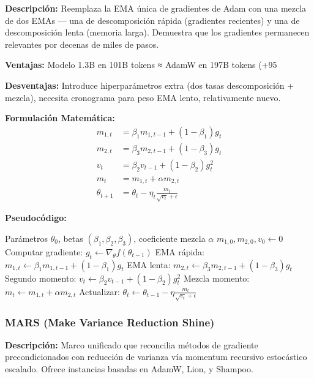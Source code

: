 \documentclass[11pt,a4paper]{article}
\begin{document}
\textbf{Descripción:} Reemplaza la EMA única de gradientes de Adam con una mezcla de dos EMAs — una de descomposición rápida (gradientes recientes) y una de descomposición lenta (memoria larga). Demuestra que los gradientes permanecen relevantes por decenas de miles de pasos.

\textbf{Ventajas:} Modelo 1.3B en 101B tokens ≈ AdamW en 197B tokens (+95%

\textbf{Desventajas:} Introduce hiperparámetros extra (dos tasas descomposición + mezcla), necesita cronograma para peso EMA lento, relativamente nuevo.

\textbf{Formulación Matemática:}
\begin{align}
m_{1,t} &= \beta_1 m_{1,t-1} + (1 - \beta_1) g_t \\
m_{2,t} &= \beta_3 m_{2,t-1} + (1 - \beta_3) g_t \\
v_t &= \beta_2 v_{t-1} + (1 - \beta_2) g_t^2 \\
m_t &= m_{1,t} + \alpha m_{2,t} \\
\theta_{t+1} &= \theta_t - \eta_t \frac{m_t}{\sqrt{v_t} + \epsilon}
\end{align}

\textbf{Pseudocódigo:}
\begin{algorithm}
\caption{AdEMAMix --- Mezcla de Medias Móviles Exponenciales}
\begin{algorithmic}[1]
\Require Parámetros $\theta_0$, betas $(\beta_1, \beta_2, \beta_3)$, coeficiente mezcla $\alpha$
\State $m_{1,0}, m_{2,0}, v_0 \gets 0$
\State Computar gradiente: $g_t \gets \nabla_\theta f(\theta_{t-1})$
\State EMA rápida: $m_{1,t} \gets \beta_1 m_{1,t-1} + (1-\beta_1) g_t$
\State EMA lenta: $m_{2,t} \gets \beta_3 m_{2,t-1} + (1-\beta_3) g_t$
\State Segundo momento: $v_t \gets \beta_2 v_{t-1} + (1-\beta_2) g_t^2$
\State Mezcla momento: $m_t \gets m_{1,t} + \alpha m_{2,t}$
\State Actualizar: $\theta_t \gets \theta_{t-1} - \eta \frac{m_t}{\sqrt{v_t}+\epsilon}$
\EndFor
\end{algorithmic}
\end{algorithm}

\subsubsection{MARS (Make Variance Reduction Shine)}

\textbf{Descripción:} Marco unificado que reconcilia métodos de gradiente precondicionados con reducción de varianza vía momentum recursivo estocástico escalado. Ofrece instancias basadas en AdamW, Lion, y Shampoo.
\end{document}
